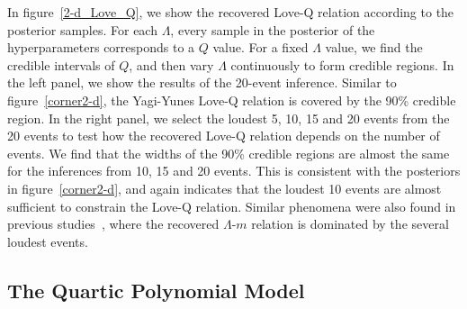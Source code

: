 \documentclass[a4paper,11pt]{article}
\begin{document}
In figure~\ref{2-d_Love_Q}, we show the recovered Love-Q relation according to
the posterior samples. For each $\Lambda$, every sample in the posterior of the 
hyperparameters corresponds to a $Q$ value. For a fixed $\Lambda$ value, we find
the credible intervals of $Q$, and then vary $\Lambda$ continuously to form
credible regions. In the left panel, we show the results of the 20-event
inference. Similar to figure~\ref{corner2-d}, the Yagi-Yunes Love-Q relation is
covered by the 90\% credible region.  In the right panel, we select the loudest
5, 10, 15 and 20 events from the 20 events to test how the recovered Love-Q
relation depends on the number of events. We find that the widths of the 90\%
credible regions are almost the same for the inferences from 10, 15 and 20
events. This is consistent with the posteriors in figure~\ref{corner2-d}, and
again indicates that the loudest 10 events are almost sufficient to constrain
the Love-Q relation. Similar phenomena were also found in previous
studies~\cite{Lackey:2014fwa, Landry:2020vaw, Pang:2020ilf, Finstad:2022oni,
Bandopadhyay:2024zrr, Wang:2024xon}, where the recovered $\Lambda$-$m$ relation
is dominated by the several loudest events.

\subsection{The Quartic Polynomial Model}
\label{subsec:results_quartic}
\end{document}
